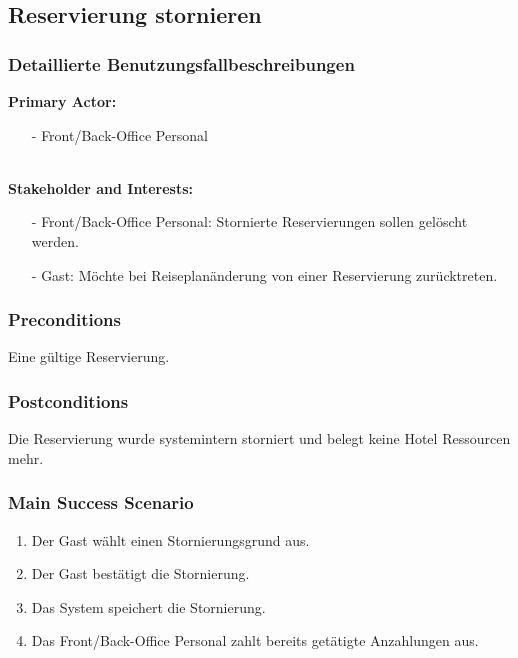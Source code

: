\documentclass[./detailed_overview_usecases.tex]{subfiles}
\begin{document}
    \subsection{Reservierung stornieren}
    \subsubsection{Detaillierte Benutzungsfallbeschreibungen}
    \textbf{Primary Actor:}
    \begin{itemize}
        \item[-]  Front/Back-Office Personal
    \end{itemize}

    \\
    \textbf{Stakeholder and Interests:}
    \begin{itemize}
        \item[-] Front/Back-Office Personal: Stornierte Reservierungen sollen gelöscht werden.
        \item[-] Gast: Möchte bei Reiseplanänderung von einer Reservierung zurücktreten.
    \end{itemize}

    \subsubsection*{Preconditions}
    Eine gültige Reservierung.

    \subsubsection*{Postconditions}
    Die Reservierung wurde systemintern storniert und belegt keine Hotel Ressourcen mehr.

    \subsubsection*{Main Success Scenario}
    \begin{enumerate}
        \item Der Gast wählt einen Stornierungsgrund aus.
        \item Der Gast bestätigt die Stornierung.
        \item Das System speichert die Stornierung.
        \item Das Front/Back-Office Personal zahlt bereits getätigte Anzahlungen aus.
    \end{enumerate}
\end{document}
